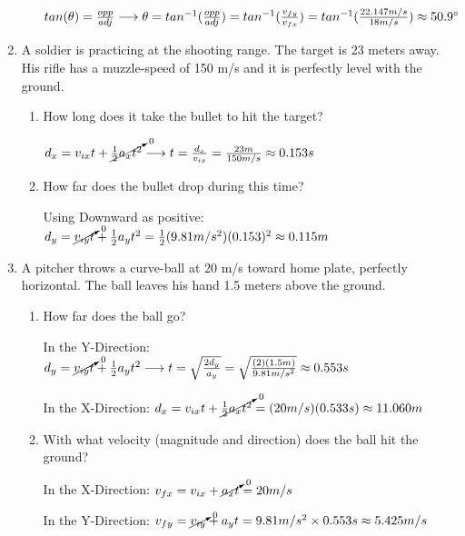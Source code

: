 \documentclass[letterpaper, 12pt]{article}
\begin{document}
\begin{enumerate}
\begin{enumerate}
	\color{red}
	$tan(\theta) = \frac{opp}{adj} \longrightarrow \theta = tan^{-1}(\frac{opp}{adj}) = tan^{-1}(\frac{v_{fy}}{v_{fx}}) =  tan^{-1}(\frac{22.147 m/s}{18 m/s}) \approx 50.9 \degree  $
	\color{black}
	\vspace{.1in}
	
\end{enumerate}

\item A soldier is practicing at the shooting range. The target is 23 meters away.  His rifle has a muzzle-speed of 150 m/s and it is perfectly level with the ground.
\begin{enumerate}
	\item How long does it take the bullet to hit the target?
	
		\color{red}
	$d_x = {v_{ix}t} + \cancelto{0}{\frac{1}{2}a_x t^2} \longrightarrow t = \frac{d_x}{v_{ix}} = \frac{23 m}{150 m/s} \approx 0.153 s  $
	
	\vspace{0.15in}
	\color{black}
	
	\item How far does the bullet drop during this time?
		\color{red}
		
		Using Downward as positive: $d_y = \cancelto{0}{v_{iy} t} + \frac{1}{2}a_y t^2 =  \frac{1}{2}(9.81 m/s^2) (0.153)^2 \approx 0.115 m$ 
			\color{black}
			\vspace{-0.1in}
\end{enumerate}
\item  A pitcher throws a curve-ball at 20 m/s toward home plate, perfectly horizontal.  The ball leaves his hand 1.5 meters above the ground.  
\begin{enumerate}
	\item How far does the ball go?
	\color{red}
	
	In the Y-Direction: $d_y = \cancelto{0}{v_{iy}t} + \frac{1}{2}a_y t^2 \longrightarrow t = \sqrt{\frac{2 d_y}{a_y}} = \sqrt{\frac{(2) (1.5m)}{9.81 m/s^2}} \approx 0.553 s $
	
	In the X-Direction: $d_x = v_{ix} t + \cancelto{0}{\frac{1}{2}a_x t^2}  = (20 m/s)(0.533s) \approx 11.060 m $

	\color{black}
	\item With what velocity (magnitude and direction) does the ball hit the ground?
		\color{red}
		
	In the X-Direction: $ v_{fx} = v_{ix} + \cancelto{0}{a_x t} = 20 m/s$  
	
	In the Y-Direction: $ v_{fy} = \cancelto{0}{v_{iy}} + a_y t = 9.81 m/s^2 \times 0.553s \approx 5.425 m/s$
	

\end{enumerate}
\end{enumerate}
\end{document}
